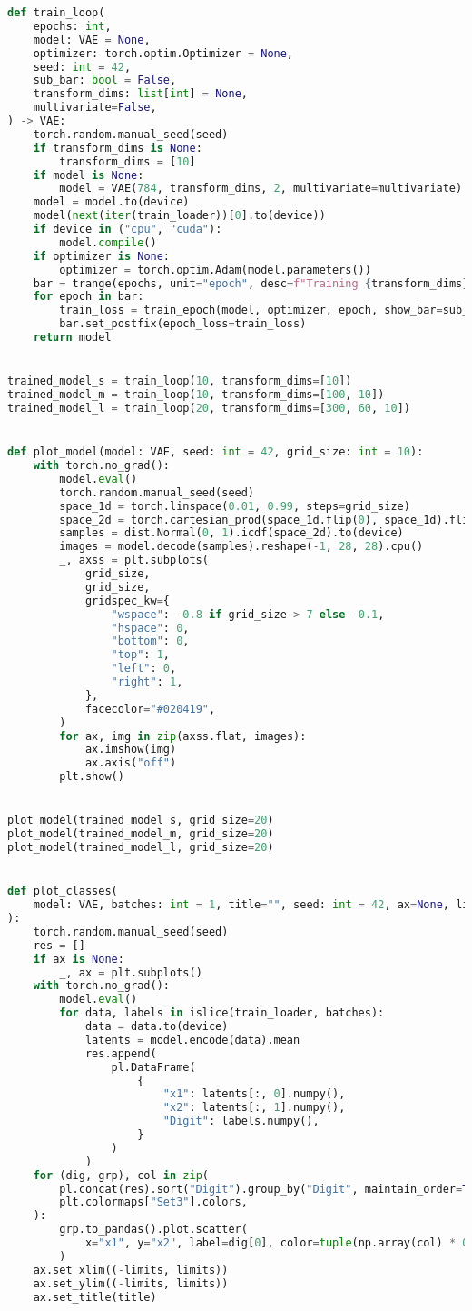 \documentclass[11pt]{article} %
\begin{document}
\begin{lstlisting}[language=Python]
def train_loop(
    epochs: int,
    model: VAE = None,
    optimizer: torch.optim.Optimizer = None,
    seed: int = 42,
    sub_bar: bool = False,
    transform_dims: list[int] = None,
    multivariate=False,
) -> VAE:
    torch.random.manual_seed(seed)
    if transform_dims is None:
        transform_dims = [10]
    if model is None:
        model = VAE(784, transform_dims, 2, multivariate=multivariate)
    model = model.to(device)
    model(next(iter(train_loader))[0].to(device))
    if device in ("cpu", "cuda"):
        model.compile()
    if optimizer is None:
        optimizer = torch.optim.Adam(model.parameters())
    bar = trange(epochs, unit="epoch", desc=f"Training {transform_dims}")
    for epoch in bar:
        train_loss = train_epoch(model, optimizer, epoch, show_bar=sub_bar)
        bar.set_postfix(epoch_loss=train_loss)
    return model


trained_model_s = train_loop(10, transform_dims=[10])
trained_model_m = train_loop(10, transform_dims=[100, 10])
trained_model_l = train_loop(20, transform_dims=[300, 60, 10])


def plot_model(model: VAE, seed: int = 42, grid_size: int = 10):
    with torch.no_grad():
        model.eval()
        torch.random.manual_seed(seed)
        space_1d = torch.linspace(0.01, 0.99, steps=grid_size)
        space_2d = torch.cartesian_prod(space_1d.flip(0), space_1d).flip(1)
        samples = dist.Normal(0, 1).icdf(space_2d).to(device)
        images = model.decode(samples).reshape(-1, 28, 28).cpu()
        _, axss = plt.subplots(
            grid_size,
            grid_size,
            gridspec_kw={
                "wspace": -0.8 if grid_size > 7 else -0.1,
                "hspace": 0,
                "bottom": 0,
                "top": 1,
                "left": 0,
                "right": 1,
            },
            facecolor="#020419",
        )
        for ax, img in zip(axss.flat, images):
            ax.imshow(img)
            ax.axis("off")
        plt.show()


plot_model(trained_model_s, grid_size=20)
plot_model(trained_model_m, grid_size=20)
plot_model(trained_model_l, grid_size=20)


def plot_classes(
    model: VAE, batches: int = 1, title="", seed: int = 42, ax=None, limits: int = 3
):
    torch.random.manual_seed(seed)
    res = []
    if ax is None:
        _, ax = plt.subplots()
    with torch.no_grad():
        model.eval()
        for data, labels in islice(train_loader, batches):
            data = data.to(device)
            latents = model.encode(data).mean
            res.append(
                pl.DataFrame(
                    {
                        "x1": latents[:, 0].numpy(),
                        "x2": latents[:, 1].numpy(),
                        "Digit": labels.numpy(),
                    }
                )
            )
    for (dig, grp), col in zip(
        pl.concat(res).sort("Digit").group_by("Digit", maintain_order=True),
        plt.colormaps["Set3"].colors,
    ):
        grp.to_pandas().plot.scatter(
            x="x1", y="x2", label=dig[0], color=tuple(np.array(col) * 0.9), ax=ax
        )
    ax.set_xlim((-limits, limits))
    ax.set_ylim((-limits, limits))
    ax.set_title(title)



\end{lstlisting}
\end{document}
